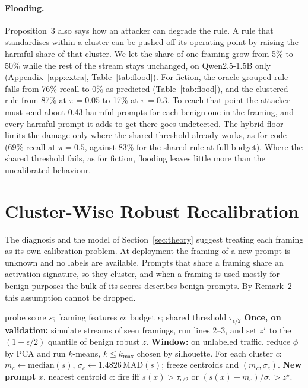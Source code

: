 \documentclass[11pt]{article}
\begin{document}
\paragraph{Flooding.}
Proposition~3 also says how an attacker can degrade the rule. A rule that standardises within a cluster can be pushed off its operating point by raising the harmful share of that cluster. We let the share of one framing grow from 5\% to 50\% while the rest of the stream stays unchanged, on Qwen2.5-1.5B only (Appendix~\ref{app:extra}, Table~\ref{tab:flood}). For fiction, the oracle-grouped rule falls from 76\% recall to 0\% as predicted (Table~\ref{tab:flood}), and the clustered rule from 87\% at $\pi=0.05$ to 17\% at $\pi=0.3$. To reach that point the attacker must send about 0.43 harmful prompts for each benign one in the framing, and every harmful prompt it adds to get there goes undetected. The hybrid floor limits the damage only where the shared threshold already works, as for code (69\% recall at $\pi=0.5$, against 83\% for the shared rule at full budget). Where the shared threshold fails, as for fiction, flooding leaves little more than the uncalibrated behaviour.

\section{Cluster-Wise Robust Recalibration}
\label{sec:method}

The diagnosis and the model of Section~\ref{sec:theory} suggest treating each framing as its own calibration problem. At deployment the framing of a new prompt is unknown and no labels are available. Prompts that share a framing share an activation signature, so they cluster, and when a framing is used mostly for benign purposes the bulk of its scores describes benign prompts. By Remark~2 this assumption cannot be dropped.

\begin{algorithm}[t]
\caption{Cluster-wise robust recalibration}
\label{alg:recal}
\begin{algorithmic}[1]
\Require probe score $s$; framing features $\phi$; budget $\epsilon$; shared threshold $\tau_{\epsilon/2}$
\State \textbf{Once, on validation:} simulate streams of seen framings, run lines 2--3, and set $z^\star$ to the $(1-\epsilon/2)$ quantile of benign robust $z$.
\State \textbf{Window:} on unlabeled traffic, reduce $\phi$ by PCA and run $k$-means, $k\le k_{\max}$ chosen by silhouette.
\State For each cluster $c$: $m_c\gets\mathrm{median}(s)$, $\sigma_c\gets1.4826\,\mathrm{MAD}(s)$; freeze centroids and $(m_c,\sigma_c)$.
\State \textbf{New prompt} $x$, nearest centroid $c$: fire iff $s(x)>\tau_{\epsilon/2}$ or $(s(x)-m_c)/\sigma_c>z^\star$.
\end{algorithmic}
\end{algorithm}
\end{document}
